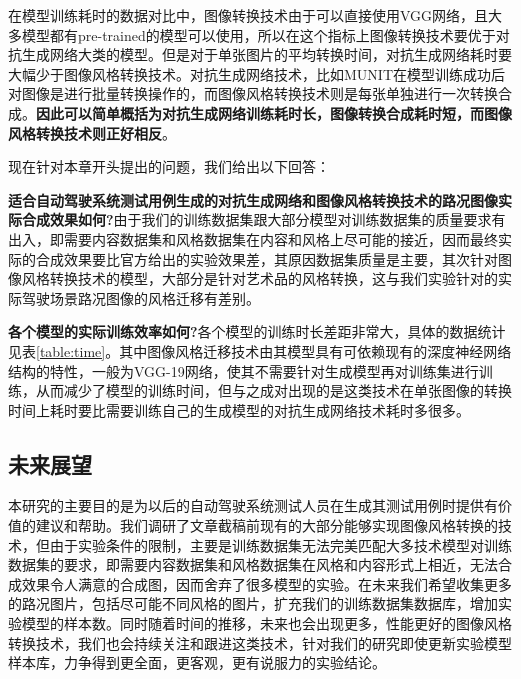 在模型训练耗时的数据对比中，图像转换技术由于可以直接使用VGG网络，且大多模型都有pre-trained的模型可以使用，所以在这个指标上图像转换技术要优于对抗生成网络大类的模型。但是对于单张图片的平均转换时间，对抗生成网络耗时要大幅少于图像风格转换技术。对抗生成网络技术，比如MUNIT在模型训练成功后对图像是进行批量转换操作的，而图像风格转换技术则是每张单独进行一次转换合成。\textbf{因此可以简单概括为对抗生成网络训练耗时长，图像转换合成耗时短，而图像风格转换技术则正好相反}。

现在针对本章开头提出的问题，我们给出以下回答：

\textbf{适合自动驾驶系统测试用例生成的对抗生成网络和图像风格转换技术的路况图像实际合成效果如何?}\quad 由于我们的训练数据集跟大部分模型对训练数据集的质量要求有出入，即需要内容数据集和风格数据集在内容和风格上尽可能的接近，因而最终实际的合成效果要比官方给出的实验效果差，其原因数据集质量是主要，其次针对图像风格转换技术的模型，大部分是针对艺术品的风格转换，这与我们实验针对的实际驾驶场景路况图像的风格迁移有差别。

\textbf{各个模型的实际训练效率如何?}\quad 各个模型的训练时长差距非常大，具体的数据统计见表\ref{table:time}。其中图像风格迁移技术由其模型具有可依赖现有的深度神经网络结构的特性，一般为VGG-19网络，使其不需要针对生成模型再对训练集进行训练，从而减少了模型的训练时间，但与之成对出现的是这类技术在单张图像的转换时间上耗时要比需要训练自己的生成模型的对抗生成网络技术耗时多很多。

\subsection{未来展望}

本研究的主要目的是为以后的自动驾驶系统测试人员在生成其测试用例时提供有价值的建议和帮助。我们调研了文章截稿前现有的大部分能够实现图像风格转换的技术，但由于实验条件的限制，主要是训练数据集无法完美匹配大多技术模型对训练数据集的要求，即需要内容数据集和风格数据集在风格和内容形式上相近，无法合成效果令人满意的合成图，因而舍弃了很多模型的实验。在未来我们希望收集更多的路况图片，包括尽可能不同风格的图片，扩充我们的训练数据集数据库，增加实验模型的样本数。同时随着时间的推移，未来也会出现更多，性能更好的图像风格转换技术，我们也会持续关注和跟进这类技术，针对我们的研究即使更新实验模型样本库，力争得到更全面，更客观，更有说服力的实验结论。
